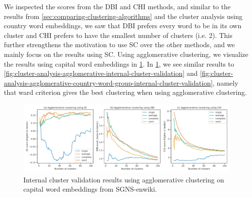 We inspected the scores from the DBI and CHI methods, and similar to the results from \cref{sec:comparing-clustering-algorithms} and the cluster analysis using country word embeddings, we saw that DBI prefers every word to be in its own cluster and CHI prefers to have the smallest number of clusters (i.e. 2). This further strengthens the motivation to use SC over the other methods, and we mainly focus on the results using SC. Using agglomerative clustering, we visualize the results using capital word embeddings in \cref{fig:cluster-analysis-agglomerative-country-capitals-word-group-internal-cluster-validation}. In \cref{fig:cluster-analysis-agglomerative-country-capitals-word-group-internal-cluster-validation}, we see similar results to \cref{fig:cluster-analysis-agglomerative-internal-cluster-validation} and \cref{fig:cluster-analysis-agglomerative-country-word-group-internal-cluster-validation}, namely that ward criterion gives the best clustering when using agglomerative clustering.
\begin{figure}[H]
    \centering
    \includegraphics[width=\textwidth]{thesis/figures/cluster-analysis-agglomerative-country-capitals-word-group-internal-cluster-validation.pdf}
    \caption{Internal cluster validation results using agglomerative clustering on capital word embeddings from SGNS-enwiki.}
    \label{fig:cluster-analysis-agglomerative-country-capitals-word-group-internal-cluster-validation}
\end{figure}

